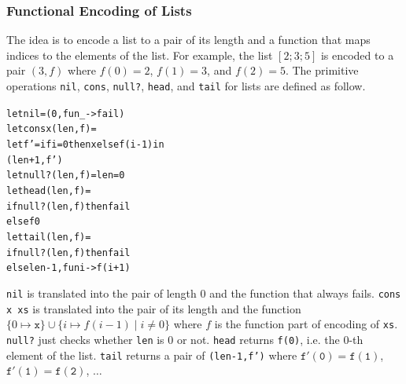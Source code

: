 %
%
%

\subsubsection{Functional Encoding of Lists}
\label{sec:list}

The idea is to encode a list to a pair of its length and a function that
maps indices to the elements of the list.  For example, the list
$[2;3;5]$ is encoded to a pair $(3,f)$ where $f(0) = 2$, $f(1) = 3$, and
$f(2) = 5$.  The primitive operations \texttt{nil}, \texttt{cons},
\texttt{null?}, \texttt{head}, and \texttt{tail} for lists are defined
as follow.
\begin{alltt}
let nil = (0, fun _ -> fail)
let cons x (len,f) =
  let f' = if i = 0 then x else f (i-1) in
    (len+1, f')
let null? (len,f) = len = 0
let head (len,f) =
  if null? (len,f) then fail
  else f 0
let tail (len,f) =
  if null? (len,f) then fail
  else len-1, fun i -> f (i+1)
\end{alltt}
\texttt{nil} is translated into the pair of length $0$ and the
function that always fails.  \texttt{cons x xs} is translated into the
pair of its length and the function $\{0 \mapsto \mathtt{x}\} \cup \{i \mapsto
f (i-1) \mid i \neq 0\}$ where $f$ is the function part of encoding of
\texttt{xs}.  \texttt{null?} just checks whether \texttt{len} is 0 or not.
\texttt{head} returns \texttt{f(0)}, i.e. the $0$-th
element of the list.  \texttt{tail} returns a pair of
\texttt{(len-1,f')} where $\mathtt{f'(0)} = \mathtt{f(1)}$,
$\mathtt{f'(1)} = \mathtt{f(2)}$, $\dots$


